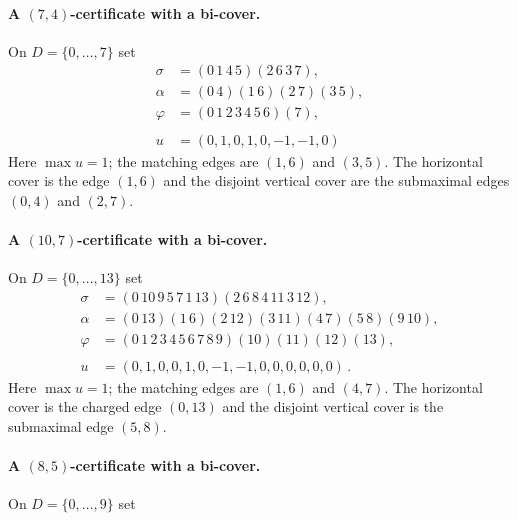 \documentclass[11pt]{article}
\theoremstyle{remark}
\begin{document}
\paragraph{A $(7,4)$-certificate with a bi-cover.}
On $D=\{0,\dots,7\}$ set
\begin{equation}
\begin{aligned}
\sigma&=(0\,1\,4\,5)(2\,6\,3\,7),\\[2pt]
\alpha&=(0\,4)(1\,6)(2\,7)(3\,5),\\[2pt]
\varphi&=(0\,1\,2\,3\,4\,5\,6)(7) ,\\[2pt] \\
u&=(0,1,0,1,0,-1,-1,0)
\end{aligned}
\label{eq:C74}
\end{equation}
Here $\max u=1$; the matching edges are $(1,6)$ and $(3,5)$. 
The horizontal cover is the edge $(1,6)$ and the disjoint vertical cover are the submaximal edges $(0,4)$ and $(2,7)$. 


\paragraph{A $(10,7)$-certificate with a bi-cover.}
On $D=\{0,\dots,13\}$ set
\begin{equation}
\begin{aligned}
\sigma&=(0\,10\,9\,5\,7\,1\,13)(2\,6\,8\,4\,11\,3\,12),\\[2pt]
\alpha&=(0\,13)(1\,6)(2\,12)(3\,11)(4\,7)(5\,8)(9\,10),\\[2pt]
\varphi&=(0\,1\,2\,3\,4\,5\,6\,7\,8\,9)(10)(11)(12)(13) ,\\[2pt] \\
u&=(0,1,0,0,1,0,-1,-1,0,0,0,0,0,0) \, .
\end{aligned}
\label{eq:C107}
\end{equation}
Here $\max u=1$; the matching edges are $(1,6)$ and $(4,7)$. The horizontal cover is the charged edge $(0,13)$ and the disjoint vertical cover is the submaximal edge $(5,8)$.


\paragraph{A $(8,5)$-certificate with a bi-cover.}
On $D=\{0,\dots,9\}$ set
\end{document}

